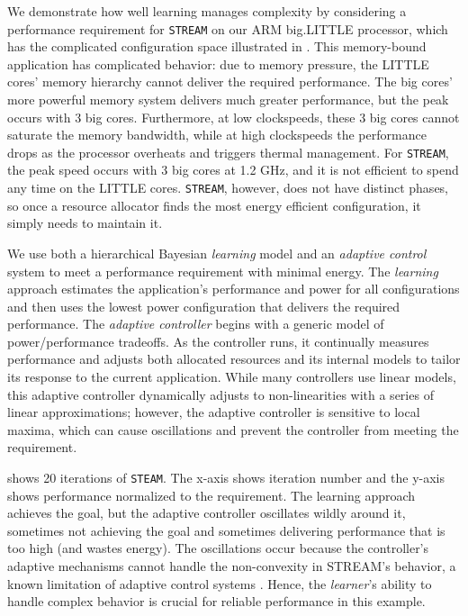 We demonstrate how well learning manages complexity by considering a
performance requirement for \texttt{STREAM} on our ARM big.LITTLE
processor, which has the complicated configuration space illustrated
in .  This memory-bound application has
complicated behavior: due to memory pressure, the LITTLE cores' memory
hierarchy cannot deliver the required performance.  The big cores'
more powerful memory system delivers much greater performance, but the
peak occurs with 3 big cores.  Furthermore, at low clockspeeds, these
3 big cores cannot saturate the memory bandwidth, while at high
clockspeeds the performance drops as the processor overheats and
triggers thermal management.  For \texttt{STREAM}, the peak speed
occurs with 3 big cores at 1.2 GHz, and it is not efficient to spend
any time on the LITTLE cores.  \texttt{STREAM}, however, does not have
distinct phases, so once a resource allocator finds the most energy
efficient configuration, it simply needs to maintain it.  

We use both a hierarchical Bayesian \emph{learning} model \cite{LEO}
and an \emph{adaptive control} system \cite{POET} to meet a
performance requirement with minimal energy.  The \emph{learning}
approach estimates the application's performance and power for all
configurations and then uses the lowest power configuration that
delivers the required performance.  The \emph{adaptive controller}
begins with a generic model of power/performance tradeoffs.  As the
controller runs, it continually measures performance and adjusts both
allocated resources and its internal models to tailor its response to
the current application.  While many controllers use linear models,
this adaptive controller dynamically adjusts to non-linearities with a
series of linear approximations; however, the adaptive controller is
sensitive to local maxima, which can cause oscillations and prevent
the controller from meeting the requirement.

 shows 20 iterations of \texttt{STEAM}.  The
x-axis shows iteration number and the y-axis shows performance
normalized to the requirement.  The learning approach achieves the
goal, but the adaptive controller oscillates wildly around it,
sometimes not achieving the goal and sometimes delivering performance
that is too high (and wastes energy).  The oscillations occur because
the controller's adaptive mechanisms cannot handle the non-convexity
in STREAM's behavior, a known limitation of adaptive control systems
\cite{ControlWare,POET,ICSE2014}.  Hence, the \emph{learner}'s ability
to handle complex behavior is crucial for reliable performance in this
example.

